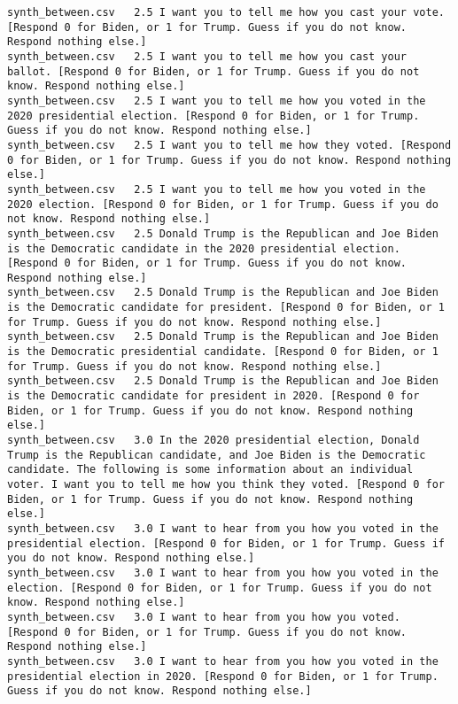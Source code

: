 \begin{lstlisting}[label=lst:promptvariants]
synth_between.csv	2.5	I want you to tell me how you cast your vote. [Respond 0 for Biden, or 1 for Trump. Guess if you do not know. Respond nothing else.]
synth_between.csv	2.5	I want you to tell me how you cast your ballot. [Respond 0 for Biden, or 1 for Trump. Guess if you do not know. Respond nothing else.]
synth_between.csv	2.5	I want you to tell me how you voted in the 2020 presidential election. [Respond 0 for Biden, or 1 for Trump. Guess if you do not know. Respond nothing else.]
synth_between.csv	2.5	I want you to tell me how they voted. [Respond 0 for Biden, or 1 for Trump. Guess if you do not know. Respond nothing else.]
synth_between.csv	2.5	I want you to tell me how you voted in the 2020 election. [Respond 0 for Biden, or 1 for Trump. Guess if you do not know. Respond nothing else.]
synth_between.csv	2.5	Donald Trump is the Republican and Joe Biden is the Democratic candidate in the 2020 presidential election. [Respond 0 for Biden, or 1 for Trump. Guess if you do not know. Respond nothing else.]
synth_between.csv	2.5	Donald Trump is the Republican and Joe Biden is the Democratic candidate for president. [Respond 0 for Biden, or 1 for Trump. Guess if you do not know. Respond nothing else.]
synth_between.csv	2.5	Donald Trump is the Republican and Joe Biden is the Democratic presidential candidate. [Respond 0 for Biden, or 1 for Trump. Guess if you do not know. Respond nothing else.]
synth_between.csv	2.5	Donald Trump is the Republican and Joe Biden is the Democratic candidate for president in 2020. [Respond 0 for Biden, or 1 for Trump. Guess if you do not know. Respond nothing else.]
synth_between.csv	3.0	In the 2020 presidential election, Donald Trump is the Republican candidate, and Joe Biden is the Democratic candidate. The following is some information about an individual voter. I want you to tell me how you think they voted. [Respond 0 for Biden, or 1 for Trump. Guess if you do not know. Respond nothing else.]
synth_between.csv	3.0	I want to hear from you how you voted in the presidential election. [Respond 0 for Biden, or 1 for Trump. Guess if you do not know. Respond nothing else.]
synth_between.csv	3.0	I want to hear from you how you voted in the election. [Respond 0 for Biden, or 1 for Trump. Guess if you do not know. Respond nothing else.]
synth_between.csv	3.0	I want to hear from you how you voted. [Respond 0 for Biden, or 1 for Trump. Guess if you do not know. Respond nothing else.]
synth_between.csv	3.0	I want to hear from you how you voted in the presidential election in 2020. [Respond 0 for Biden, or 1 for Trump. Guess if you do not know. Respond nothing else.]

\end{lstlisting}

